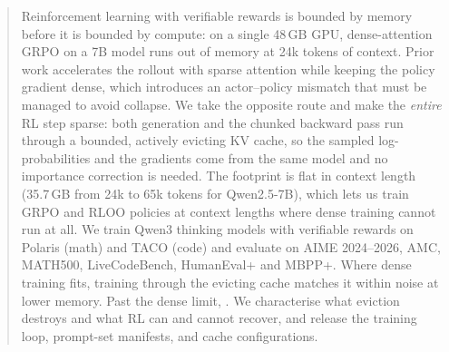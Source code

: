 \begin{abstract}
Reinforcement learning with verifiable rewards is bounded by memory before it
is bounded by compute: on a single 48\,GB GPU, dense-attention GRPO on a 7B
model runs out of memory at 24k tokens of context. Prior work accelerates the
rollout with sparse attention while keeping the policy gradient dense, which
introduces an actor--policy mismatch that must be managed to avoid collapse.
We take the opposite route and make the \emph{entire} RL step sparse: both
generation and the chunked backward pass run through a bounded, actively
evicting KV cache, so the sampled log-probabilities and the gradients come
from the same model and no importance correction is needed. The footprint is
flat in context length (35.7\,GB from 24k to 65k tokens for Qwen2.5-7B), which
lets us train GRPO and RLOO policies at context lengths where dense training
cannot run at all. We train Qwen3 thinking models with verifiable rewards on
Polaris (math) and TACO (code) and evaluate on AIME 2024--2026, AMC, MATH500,
LiveCodeBench, HumanEval+ and MBPP+. Where dense training fits, training
through the evicting cache matches it within noise at lower memory. Past the
dense limit, . We characterise
what eviction destroys and what RL can and cannot recover, and release the
training loop, prompt-set manifests, and cache configurations.
\end{abstract}

